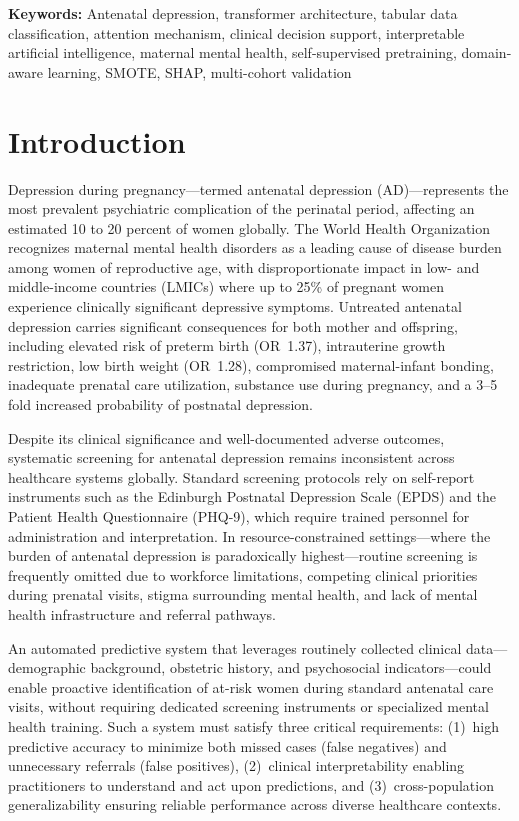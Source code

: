 \documentclass[12pt,a4paper]{article}
\begin{document}
\noindent\textbf{Keywords:} Antenatal depression, transformer architecture, tabular data classification, attention mechanism, clinical decision support, interpretable artificial intelligence, maternal mental health, self-supervised pretraining, domain-aware learning, SMOTE, SHAP, multi-cohort validation

\newpage

\section{Introduction}

Depression during pregnancy---termed antenatal depression (AD)---represents the most prevalent psychiatric complication of the perinatal period, affecting an estimated 10 to 20 percent of women globally\cite{woody2017}. The World Health Organization recognizes maternal mental health disorders as a leading cause of disease burden among women of reproductive age, with disproportionate impact in low- and middle-income countries (LMICs) where up to 25\% of pregnant women experience clinically significant depressive symptoms\cite{fisher2012}. Untreated antenatal depression carries significant consequences for both mother and offspring, including elevated risk of preterm birth (OR~1.37), intrauterine growth restriction, low birth weight (OR~1.28), compromised maternal-infant bonding, inadequate prenatal care utilization, substance use during pregnancy, and a 3--5 fold increased probability of postnatal depression\cite{grote2010, howard2014}.

Despite its clinical significance and well-documented adverse outcomes, systematic screening for antenatal depression remains inconsistent across healthcare systems globally. Standard screening protocols rely on self-report instruments such as the Edinburgh Postnatal Depression Scale (EPDS)\cite{cox1987} and the Patient Health Questionnaire (PHQ-9)\cite{kroenke2001}, which require trained personnel for administration and interpretation. In resource-constrained settings---where the burden of antenatal depression is paradoxically highest---routine screening is frequently omitted due to workforce limitations, competing clinical priorities during prenatal visits, stigma surrounding mental health, and lack of mental health infrastructure and referral pathways\cite{rahman2008}.

An automated predictive system that leverages routinely collected clinical data---demographic background, obstetric history, and psychosocial indicators---could enable proactive identification of at-risk women during standard antenatal care visits, without requiring dedicated screening instruments or specialized mental health training. Such a system must satisfy three critical requirements: (1)~high predictive accuracy to minimize both missed cases (false negatives) and unnecessary referrals (false positives), (2)~clinical interpretability enabling practitioners to understand and act upon predictions, and (3)~cross-population generalizability ensuring reliable performance across diverse healthcare contexts.
\end{document}
